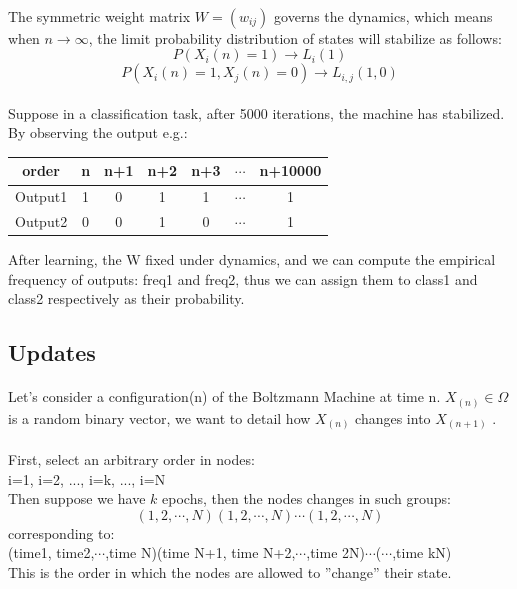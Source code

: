 \documentclass{article}
\begin{document}
\paragraph{}
The symmetric weight matrix $W=(w_{ij})$ governs the dynamics, which means when $n\to \infty$, the limit probability distribution of  states will stabilize as follows:
\[P(X_i(n)=1)\to L_i(1)\]
\[P(X_i(n)=1,X_j(n)=0)\to L_{i,j}(1,0)\]
\paragraph{}
Suppose in a classification task, after 5000 iterations, the machine has stabilized. By observing the output e.g.:

\begin{table}[!hbp]\centering
\begin{tabular}{|c|c|c|c|c|c|c|}
\hline
order& n & n+1 & n+2 & n+3 & $\cdots$ & n+10000\\
\hline
Output1 & 1 &  0  &  1  &  1   &  $\cdots$ & 1 \\
\hline
Output2 &0 &  0  &  1  &  0   &  $\cdots$ & 1 \\
\hline
\end{tabular}
\end{table}

After learning, the W fixed under dynamics, and we can compute the empirical frequency of outputs: freq1 and freq2, thus we can assign them to class1 and class2 respectively as their probability.\\

\subsection{Updates}
\paragraph{}
Let's consider a configuration(n) of the Boltzmann Machine at time n.
$X_{(n)}\in \Omega$ is a random binary vector, we want to detail how $X_{(n)}$ changes into $X_{(n+1)}$ .
\paragraph{}
First, select an arbitrary order in nodes:\\
i=1, i=2, ..., i=k, ..., i=N\\
Then suppose we have $k$ epochs, then the nodes changes in such groups:
\[(1,2,\cdots,N)(1,2,\cdots,N)\cdots(1,2,\cdots,N)\]
corresponding to:\\
(time1, time2,$\cdots$,time N)(time N+1, time N+2,$\cdots$,time 2N)$\cdots$($\cdots$,time kN)\\
This is the order in which the nodes are allowed to ''change'' their state.
\end{document}

